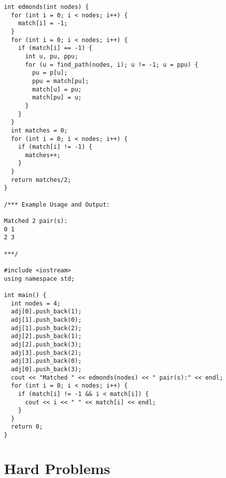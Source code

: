 \begin{lstlisting}
int edmonds(int nodes) {
  for (int i = 0; i < nodes; i++) {
    match[i] = -1;
  }
  for (int i = 0; i < nodes; i++) {
    if (match[i] == -1) {
      int u, pu, ppu;
      for (u = find_path(nodes, i); u != -1; u = ppu) {
        pu = p[u];
        ppu = match[pu];
        match[u] = pu;
        match[pu] = u;
      }
    }
  }
  int matches = 0;
  for (int i = 0; i < nodes; i++) {
    if (match[i] != -1) {
      matches++;
    }
  }
  return matches/2;
}

/*** Example Usage and Output:

Matched 2 pair(s):
0 1
2 3

***/

#include <iostream>
using namespace std;

int main() {
  int nodes = 4;
  adj[0].push_back(1);
  adj[1].push_back(0);
  adj[1].push_back(2);
  adj[2].push_back(1);
  adj[2].push_back(3);
  adj[3].push_back(2);
  adj[3].push_back(0);
  adj[0].push_back(3);
  cout << "Matched " << edmonds(nodes) << " pair(s):" << endl;
  for (int i = 0; i < nodes; i++) {
    if (match[i] != -1 && i < match[i]) {
      cout << i << " " << match[i] << endl;
    }
  }
  return 0;
}
\end{lstlisting}

\section{Hard Problems}
\setcounter{section}{7}
\setcounter{subsection}{0}
